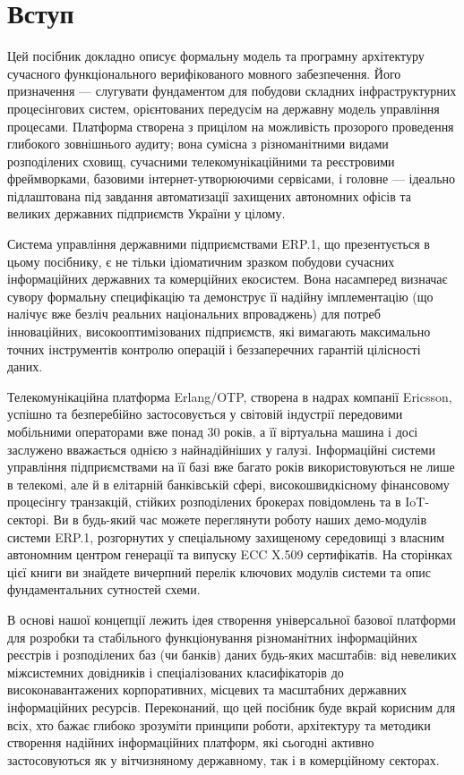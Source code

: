 \chapter{Вступ}

Цей посібник докладно описує формальну модель та програмну архітектуру сучасного функціонального верифікованого мовного забезпечення. Його призначення — слугувати фундаментом для побудови складних інфраструктурних процесінгових систем, орієнтованих передусім на державну модель управління процесами. Платформа створена з прицілом на можливість прозорого проведення глибокого зовнішнього аудиту; вона сумісна з різноманітними видами розподілених сховищ, сучасними телекомунікаційними та реєстровими фреймворками, базовими інтернет-утворюючими сервісами, і головне — ідеально підлаштована під завдання автоматизації захищених автономних офісів та великих державних підприємств України у цілому.

Система управління державними підприємствами ERP.1, що презентується в цьому посібнику, є не тільки ідіоматичним зразком побудови сучасних інформаційних державних та комерційних екосистем. Вона насамперед визначає сувору формальну специфікацію та демонструє її надійну імплементацію (що налічує вже безліч реальних національних впроваджень) для потреб інноваційних, високооптимізованих підприємств, які вимагають максимально точних інструментів контролю операцій і беззаперечних гарантій цілісності даних.

Телекомунікаційна платформа Erlang/OTP, створена в надрах компанії Ericsson, успішно та безперебійно застосовується у світовій індустрії передовими мобільними операторами вже понад 30 років, а її віртуальна машина і досі заслужено вважається однією з найнадійніших у галузі. Інформаційні системи управління підприємствами на її базі вже багато років використовуються не лише в телекомі, але й в елітарній банківській сфері, високошвидкісному фінансовому процесінгу транзакцій, стійких розподілених брокерах повідомлень та в IoT-секторі. Ви в будь-який час можете переглянути роботу наших демо-модулів системи ERP.1, розгорнутих у спеціальному захищеному середовищі з власним автономним центром генерації та випуску ECC X.509 сертифікатів. На сторінках цієї книги ви знайдете вичерпний перелік ключових модулів системи та опис фундаментальних сутностей схеми.

В основі нашої концепції лежить ідея створення універсальної базової платформи для розробки та стабільного функціонування різноманітних інформаційних реєстрів і розподілених баз (чи банків) даних будь-яких масштабів: від невеликих міжсистемних довідників і спеціалізованих класифікаторів до високонавантажених корпоративних, місцевих та масштабних державних інформаційних ресурсів. Переконаний, що цей посібник буде вкрай корисним для всіх, хто бажає глибоко зрозуміти принципи роботи, архітектуру та методики створення надійних інформаційних платформ, які сьогодні активно застосовуються як у вітчизняному державному, так і в комерційному секторах.
